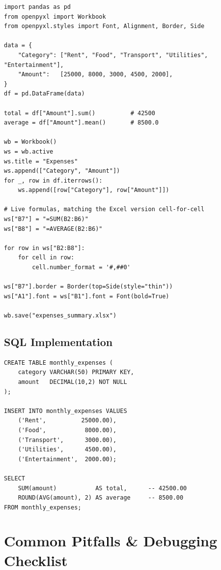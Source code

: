 \documentclass[11pt,a4paper]{article}
\begin{document}
\begin{lstlisting}[style=pythonstyle, caption={End-to-end: build the data, compute totals, write a formatted .xlsx}]
import pandas as pd
from openpyxl import Workbook
from openpyxl.styles import Font, Alignment, Border, Side

data = {
    "Category": ["Rent", "Food", "Transport", "Utilities", "Entertainment"],
    "Amount":   [25000, 8000, 3000, 4500, 2000],
}
df = pd.DataFrame(data)

total = df["Amount"].sum()          # 42500
average = df["Amount"].mean()       # 8500.0

wb = Workbook()
ws = wb.active
ws.title = "Expenses"
ws.append(["Category", "Amount"])
for _, row in df.iterrows():
    ws.append([row["Category"], row["Amount"]])

# Live formulas, matching the Excel version cell-for-cell
ws["B7"] = "=SUM(B2:B6)"
ws["B8"] = "=AVERAGE(B2:B6)"

for row in ws["B2:B8"]:
    for cell in row:
        cell.number_format = '#,##0'

ws["B7"].border = Border(top=Side(style="thin"))
ws["A1"].font = ws["B1"].font = Font(bold=True)

wb.save("expenses_summary.xlsx")
\end{lstlisting}

\subsection{SQL Implementation}

\begin{lstlisting}[style=sqlstyle, caption={Same summary via schema + aggregate query}]
CREATE TABLE monthly_expenses (
    category VARCHAR(50) PRIMARY KEY,
    amount   DECIMAL(10,2) NOT NULL
);

INSERT INTO monthly_expenses VALUES
    ('Rent',          25000.00),
    ('Food',           8000.00),
    ('Transport',      3000.00),
    ('Utilities',      4500.00),
    ('Entertainment',  2000.00);

SELECT
    SUM(amount)           AS total,      -- 42500.00
    ROUND(AVG(amount), 2) AS average     -- 8500.00
FROM monthly_expenses;
\end{lstlisting}

\section{Common Pitfalls \& Debugging Checklist}
\end{document}

